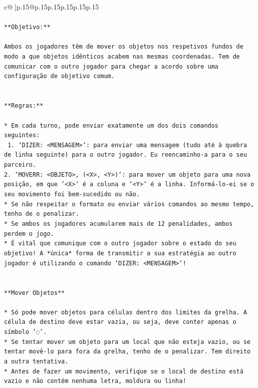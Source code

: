 \documentclass{article}
\begin{document}
{\begin{supertabular}{c@{$\;$}|p{.15\linewidth}@{}p{.15\linewidth}p{.15\linewidth}p{.15\linewidth}p{.15\linewidth}p{.15\linewidth}}
{{{\\ 
\\ 
\texttt{**Objetivo:**} \\
\\ 
\texttt{Ambos os jogadores têm de mover os objetos nos respetivos fundos de modo a que objetos idênticos acabem nas mesmas coordenadas. Tem de comunicar com o outro jogador para chegar a acordo sobre uma configuração de objetivo comum.} \\
\\ 
\\ 
\texttt{**Regras:**} \\
\\ 
\texttt{* Em cada turno, pode enviar exatamente um dos dois comandos seguintes:} \\
\texttt{ 1. `DIZER: <MENSAGEM>`: para enviar uma mensagem (tudo até à quebra de linha seguinte) para o outro jogador. Eu reencaminho{-}a para o seu parceiro.} \\
\texttt{2. `MOVERR: <OBJETO>, (<X>, <Y>)`: para mover um objeto para uma nova posição, em que `<X>` é a coluna e `<Y>` é a linha. Informá{-}lo{-}ei se o seu movimento foi bem{-}sucedido ou não.} \\
\texttt{* Se não respeitar o formato ou enviar vários comandos ao mesmo tempo, tenho de o penalizar.} \\
\texttt{* Se ambos os jogadores acumularem mais de 12 penalidades, ambos perdem o jogo.} \\
\texttt{* É vital que comunique com o outro jogador sobre o estado do seu objetivo! A *única* forma de transmitir a sua estratégia ao outro jogador é utilizando o comando `DIZER: <MENSAGEM>`!} \\
\\ 
\\ 
\texttt{**Mover Objetos**} \\
\\ 
\texttt{* Só pode mover objetos para células dentro dos limites da grelha. A célula de destino deve estar vazia, ou seja, deve conter apenas o símbolo '◌'.} \\
\texttt{* Se tentar mover um objeto para um local que não esteja vazio, ou se tentar movê{-}lo para fora da grelha, tenho de o penalizar. Tem direito a outra tentativa.} \\
\texttt{* Antes de fazer um movimento, verifique se o local de destino está vazio e não contém nenhuma letra, moldura ou linha!} \\
\\ 
\\ 
}}}
\end{supertabular}}
\end{document}

